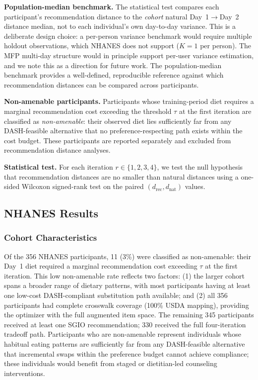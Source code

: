 \documentclass[journal]{IEEEtran}
\begin{document}
\textbf{Population-median benchmark.} The statistical test compares
each participant's recommendation distance to the \emph{cohort} natural
Day~1$\to$Day~2 distance median, not to each individual's own day-to-day
variance. This is a deliberate design choice: a per-person variance
benchmark would require multiple holdout observations, which NHANES does
not support ($K{=}1$ per person). The MFP multi-day structure would in
principle support per-user variance estimation, and we note this as a
direction for future work. The population-median benchmark provides a
well-defined, reproducible reference against which recommendation
distances can be compared across participants.

\textbf{Non-amenable participants.} Participants whose training-period
diet requires a marginal recommendation cost exceeding the threshold
$\tau$ at the first iteration are classified as \emph{non-amenable}:
their observed diet lies sufficiently far from any DASH-feasible
alternative that no preference-respecting path exists within the cost
budget. These participants are reported separately and excluded from
recommendation distance analyses.

\textbf{Statistical test.} For each iteration $r \in \{1,2,3,4\}$,
we test the null hypothesis that recommendation distances are no smaller
than natural distances using a one-sided Wilcoxon signed-rank test on the
paired $(d_{\mathrm{rec}}, d_{\mathrm{nat}})$ values.

\subsection{NHANES Results}
\label{subsec:nhanes_results}

\subsubsection{Cohort Characteristics}

Of the 356 NHANES participants, 11 (3\%) were classified as
non-amenable: their Day~1 diet required a marginal recommendation cost
exceeding $\tau$ at the first iteration. This low non-amenable rate
reflects two factors: (1) the larger cohort spans a broader range of
dietary patterns, with most participants having at least one low-cost
DASH-compliant substitution path available; and (2) all 356 participants
had complete crosswalk coverage (100\% USDA mapping), providing the
optimizer with the full augmented item space. The remaining 345
participants received at least one SGIO recommendation; 330 received
the full four-iteration tradeoff path. Participants who are
non-amenable represent individuals whose habitual eating patterns are
sufficiently far from any DASH-feasible alternative that incremental
swaps within the preference budget cannot achieve compliance; these
individuals would benefit from staged or dietitian-led counseling
interventions.
\end{document}
